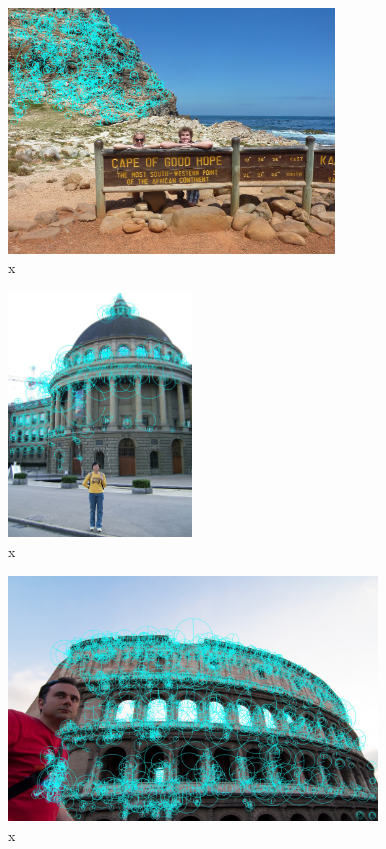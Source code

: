 \documentclass[runningheads]{llncs}
\begin{document}
\begin{figure} \centering \includegraphics[height=6.5cm]{images/emmersberger.jpg}
\caption{x} \label{fig:example} \end{figure}

\begin{figure} \centering \includegraphics[height=6.5cm]{images/ETH_danfeng.jpg}
\caption{x} \label{fig:example} \end{figure}

\begin{figure} \centering \includegraphics[height=6.5cm]{images/gabriele.jpg}
\caption{x} \label{fig:example} \end{figure}
\end{document}
